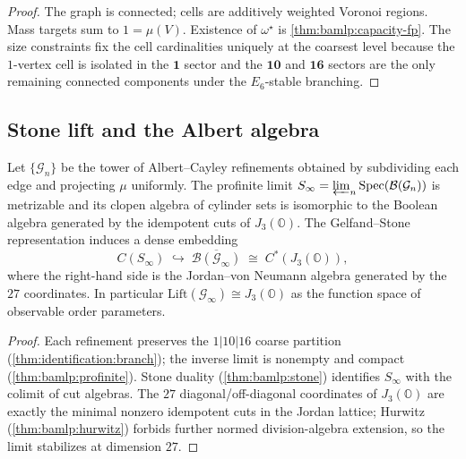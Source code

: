 \begin{proof}
The graph is connected; cells are additively weighted Voronoi regions. Mass
targets sum to $1=\mu(V)$. Existence of $\omega^\star$ is
\autoref{thm:bamlp:capacity-fp}. The size constraints fix the cell cardinalities
uniquely at the coarsest level because the $1$-vertex cell is isolated in the
$\mathbf{1}$ sector and the $\mathbf{10}$ and $\mathbf{16}$ sectors are the
only remaining connected components under the $E_6$-stable branching.
\end{proof}

\subsection{Stone lift and the Albert algebra}
\label{sec:identification:stone}

\begin{theorem}\label{thm:identification:stone}
Let $\{\mathcal{G}_n\}$ be the tower of Albert--Cayley refinements obtained by
subdividing each edge and projecting $\mu$ uniformly. The profinite limit
$S_\infty=\varprojlim_n\mathrm{Spec}(\mathcal{B}(\mathcal{G}_n))$ is metrizable
and its clopen algebra of cylinder sets is isomorphic to the Boolean algebra
generated by the idempotent cuts of $J_3(\mathbb{O})$. The Gelfand--Stone
representation induces a dense embedding
\begin{equation}
  C(S_\infty)\;\hookrightarrow\;\overline{\mathcal{B}(\mathcal{G}_\infty)}
  \;\cong\; C^*(J_3(\mathbb{O})),
\end{equation}
where the right-hand side is the Jordan--von Neumann algebra generated by the
$27$ coordinates. In particular $\mathrm{Lift}(\mathcal{G}_\infty)\cong
J_3(\mathbb{O})$ as the function space of observable order parameters.
\end{theorem}

\begin{proof}
Each refinement preserves the $1|10|16$ coarse partition
(\autoref{thm:identification:branch}); the inverse limit is nonempty and compact
(\autoref{thm:bamlp:profinite}). Stone duality
(\autoref{thm:bamlp:stone}) identifies $S_\infty$ with the colimit of cut
algebras. The $27$ diagonal/off-diagonal coordinates of $J_3(\mathbb{O})$ are
exactly the minimal nonzero idempotent cuts in the Jordan lattice; Hurwitz
(\autoref{thm:bamlp:hurwitz}) forbids further normed division-algebra extension,
so the limit stabilizes at dimension $27$.
\end{proof}

